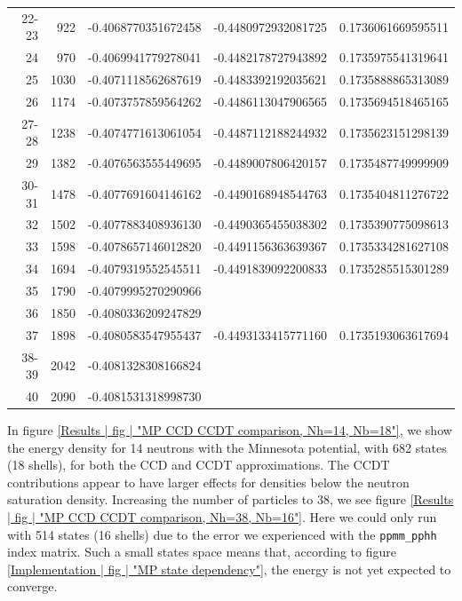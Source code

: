 \documentclass[10pt,twoside]{report}
\begin{document}
\begin{table}
\begin{tabular}{rrlll}
			22-23 & 922 & -0.4068770351672458 & -0.4480972932081725 & 0.1736061669595511\\ 
			24 & 970 & -0.4069941779278041 & -0.4482178727943892 & 0.1735975541319641\\ 
			25 & 1030 & -0.4071118562687619 & -0.4483392192035621 & 0.1735888865313089\\ 
			26 & 1174 & -0.4073757859564262 & -0.4486113047906565 & 0.1735694518465165\\ 
			27-28 & 1238 & -0.4074771613061054 & -0.4487112188244932 & 0.1735623151298139\\ 
			29 & 1382 & -0.4076563555449695 & -0.4489007806420157 & 0.1735487749999909\\ 
			30-31 & 1478 & -0.4077691604146162 & -0.4490168948544763 & 0.1735404811276722\\
			32 & 1502 & -0.4077883408936130 & -0.4490365455038302 & 0.1735390775098613\\ 
			33 & 1598 & -0.4078657146012820 & -0.4491156363639367 & 0.1735334281627108\\ 
			34 & 1694 & -0.4079319552545511 & -0.4491839092200833 & 0.1735285515301289\\ 
			35 & 1790 & -0.4079995270290966 & &\\ 
			36 & 1850 & -0.4080336209247829 & &\\ 
			37 & 1898 & -0.4080583547955437 & -0.4493133415771160 & 0.1735193063617694\\ 
			38-39 & 2042 & -0.4081328308166824 & &\\ 
			40 & 2090 & -0.4081531318998730 & &\\ 
		\end{tabular}
		\label{Appendix B | table | CCDT for HEG rs=2.0}
	\end{table}
	
	\newpage
	

	In figure \ref{Results | fig | "MP CCD CCDT comparison, Nh=14, Nb=18"}, we show the energy density for 14 neutrons with the Minnesota potential, with 682 states (18 shells), for both the CCD and CCDT approximations. The CCDT contributions appear to have larger effects for densities below the neutron saturation density. Increasing the number of particles to 38, we see figure \ref{Results | fig | "MP CCD CCDT comparison, Nh=38, Nb=16"}. Here we could only run with 514 states (16 shells) due to the error we experienced with the \texttt{ppmm\_pphh} index matrix. Such a small states space means that, according to figure \ref{Implementation | fig | "MP state dependency"}, the energy is not yet expected to converge.\\
		
\end{document}

